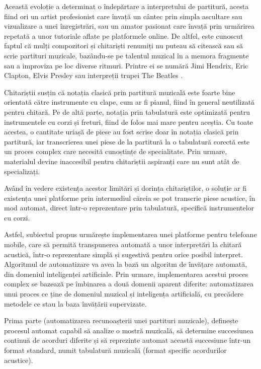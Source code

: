 \documentclass[a4paper,12pt]{report}
\begin{document}
Această evoloție a determinat o îndepărtare a interpretului de partitură, acesta fiind ori un artist profesionist care
învață un cântec prin simpla ascultare sau vizualizare a unei înregistrări, sau un amator
pasionat care învață prin urmărirea repetată a unor tutoriale aflate pe platformele
online. De altfel, este cunoscut faptul că mulți compozitori și chitariști renumiți nu puteau
să citească sau să scrie partituri muzicale, bazându-se pe talentul muzical 
în a memora fragmente sau a improviza pe loc diverse ritmuri.
Printre ei se numără Jimi Hendrix, Eric Clapton, Elvis Presley sau
interpreții trupei The Beatles \cite{WEBSITE:the-music-studio}.

Chitariștii susțin că notația clasică prin partitură muzicală este foarte bine orientată
către instrumente cu clape, cum ar fi pianul, fiind în general neutilizată pentru chitară. 
Pe de altă parte, notația prin tabulatură este optimizată pentru instrumentele cu corzi și
freturi, fiind de folos mai mare pentru aceștia. Cu toate acestea, o cantitate uriașă de 
piese au fost scrise doar în notația clasică prin partitură, iar transcrierea unei piese
de la partitură la o tabulatură corectă este un proces complex care necesită cunoștințe 
de specialitate. Prin urmare, materialul devine inaccesibil pentru chitariștii aspiranți care
nu sunt atât de specializați.

Având în vedere existența acestor limitări și dorința chitariștilor, o soluție 
ar fi existența unei platforme prin intermediul căreia se pot transcrie piese 
acustice, în mod automat, direct într-o reprezentare prin tabulatură, specifică
instrumentelor cu corzi.

Astfel, subiectul propus urmărește implementarea unei platforme pentru telefoane
mobile, care să permită transpunerea automată a unor interpretări la chitară acustică, într-o
reprezentare simplă și sugestivă pentru orice posibil interpret. Algoritmul 
de automatizare va avea la bază un algoritm de învățare automată, din domeniul
inteligenței artificiale. Prin urmare, implementarea acestui proces complex se 
bazează pe îmbinarea a două domenii aparent diferite: automatizarea unui proces ce ține de domeniul 
muzical și inteligența artificială, cu 
precădere metodele ce stau la baza învățării supervizate. 

Prima parte (automatizarea recunoașterii unei partituri muzicale),
definește procesul automat capabil să analize o mostră muzicală, să determine 
succesiunea continuă de acorduri diferite și să reprezinte automat această 
succesiune într-un format standard, numit tabulatură muzicală 
(format specific acordurilor acustice). 
\end{document}
